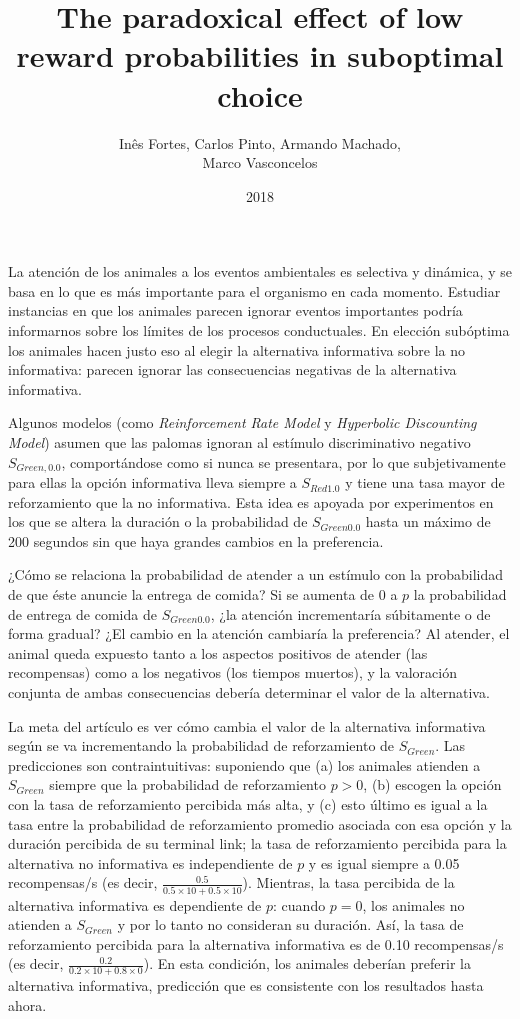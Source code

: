 \documentclass[a4paper,12pt]{article}
\title{The paradoxical effect of low reward probabilities in suboptimal choice}
\author{Inês Fortes, Carlos Pinto, Armando Machado,\\ Marco Vasconcelos}
\date{2018}
\begin{document}
{\scshape\bfseries \maketitle}

La atención de los animales a los eventos ambientales es selectiva y dinámica, y se basa en lo que es más importante para el organismo en cada momento. Estudiar instancias en que los animales parecen ignorar eventos importantes podría informarnos sobre los límites de los procesos conductuales. En elección subóptima los animales hacen justo eso al elegir la alternativa informativa sobre la no informativa: parecen ignorar las consecuencias negativas de la alternativa informativa.

Algunos modelos (como {\itshape Reinforcement Rate Model} y {\itshape Hyperbolic Discounting Model}) asumen que las palomas ignoran al estímulo discriminativo negativo $S_{Green,0{.}0}$, comportándose como si nunca se presentara, por lo que subjetivamente para ellas la opción informativa lleva siempre a $S_{Red1{.}0}$ y tiene una tasa mayor de reforzamiento que la no informativa. Esta idea es apoyada por experimentos en los que se altera la duración o la probabilidad de $S_{Green0{.}0}$ hasta un máximo de 200 segundos sin que haya grandes cambios en la preferencia.

¿Cómo se relaciona la probabilidad de atender a un estímulo con la probabilidad de que éste anuncie la entrega de comida? Si se aumenta de 0 a $p$ la probabilidad de entrega de comida de $S_{Green0{.}0}$, ¿la atención incrementaría súbitamente o de forma gradual? ¿El cambio en la atención cambiaría la preferencia? Al atender, el animal queda expuesto tanto a los aspectos positivos de atender (las recompensas) como a los negativos (los tiempos muertos), y la valoración conjunta de ambas consecuencias debería determinar el valor de la alternativa.

La meta del artículo es ver cómo cambia el valor de la alternativa informativa según se va incrementando la probabilidad de reforzamiento de $S_{Green}$. Las predicciones son contraintuitivas: suponiendo que (a) los animales atienden a $S_{Green}$ siempre que la probabilidad de reforzamiento $p > 0$, (b) escogen la opción con la tasa de reforzamiento percibida más alta, y (c) esto último es igual a la tasa entre la probabilidad de reforzamiento promedio asociada con esa opción y la duración percibida de su terminal link; la tasa de reforzamiento percibida para la alternativa no informativa es independiente de $p$ y es igual siempre a 0.05 recompensas/s (es decir, $\frac{0.5}{0.5\times10+0.5\times10}$). Mientras, la tasa percibida de la alternativa informativa es dependiente de $p$: cuando $p=0$, los animales no atienden a $S_{Green}$ y por lo tanto no consideran su duración. Así, la tasa de reforzamiento percibida para la alternativa informativa es de 0.10 recompensas/s (es decir, $\frac{0.2}{0.2\times10+0.8\times0}$). En esta condición, los animales deberían preferir la alternativa informativa, predicción que es consistente con los resultados hasta ahora. 
\end{document}
